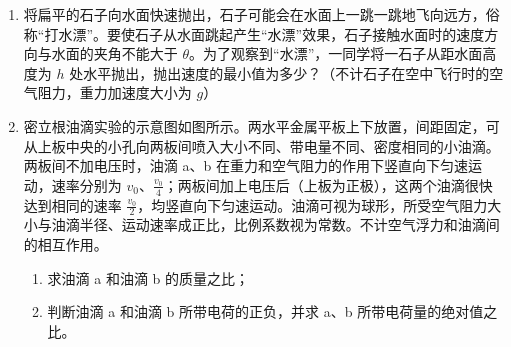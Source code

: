 \documentclass[\gkver]{gaokaozhenti}
\begin{document}
\begin{enumerate}
{（2）角度盘的大小一定，即在规定的位置安装角度盘，测量的摆角准确，但将角度盘固定在规定位置上方，即角度盘到悬挂点的距离变短，同样的角度，摆线在刻度盘上扫过的弧长变短，故摆线在角度盘上所指的示数为 $5\Udu$ 时，实际摆角大于 $5\Udu$；

（3）单摆的摆线长度为 $81.50\Ucm$，则摆长为

$l=l_{0}+\frac{d}{2}=81.50\Ucm+\frac{2.0027}{2}\Ucm=82.5\Ucm$

结果保留三位有效数字，得摆长为 $82.5\Ucm$；

一次全振动单摆经过最低点两次，故此单摆的周期为

$T=\frac{2t}{N}=\frac{54.60}{30}\Us=1.82\Us$

由单摆的周期表达式 $T = 2\pi \sqrt{\frac{l}{g}}$ 得，重力加速度

$g = \frac{4\pi^{2}l}{T^{2}} = 9.83\Umsq$
}

\item
将扁平的石子向水面快速抛出，石子可能会在水面上一跳一跳地飞向远方，俗称“打水漂”。要使石子从水面跳起产生“水漂”效果，石子接触水面时的速度方向与水面的夹角不能大于 $\theta$。为了观察到“水漂”，一同学将一石子从距水面高度为 $h$ 处水平抛出，抛出速度的最小值为多少？（不计石子在空中飞行时的空气阻力，重力加速度大小为 $g$）


\item
密立根油滴实验的示意图如图所示。两水平金属平板上下放置，间距固定，可从上板中央的小孔向两板间喷入大小不同、带电量不同、密度相同的小油滴。两板间不加电压时，油滴 a、b 在重力和空气阻力的作用下竖直向下匀速运动，速率分别为 $v_{0}$、$\frac{v_{0}}{4}$；两板间加上电压后（上板为正极），这两个油滴很快达到相同的速率 $\frac{v_{0}}{2}$，均竖直向下匀速运动。油滴可视为球形，所受空气阻力大小与油滴半径、运动速率成正比，比例系数视为常数。不计空气浮力和油滴间的相互作用。
\begin{enumerate}
	\item
	求油滴 a 和油滴 b 的质量之比；
	\item
	判断油滴 a 和油滴 b 所带电荷的正负，并求 a、b 所带电荷量的绝对值之比。
\end{enumerate}


\end{enumerate}
\end{document}
